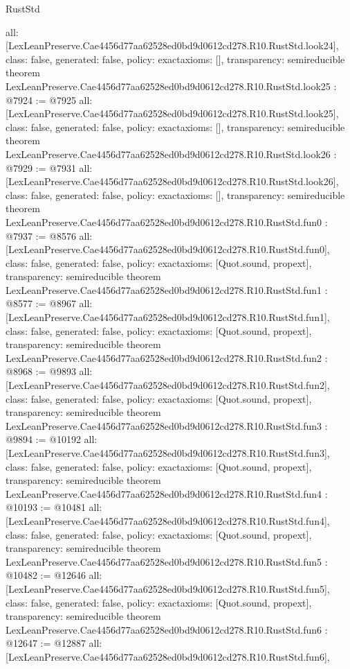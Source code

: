 \begin{lexlean}{RustStd}
\begin{coremodule}
{  all: [LexLeanPreserve.Cae4456d77aa62528ed0bd9d0612cd278.R10.RustStd.look24],
  class: false,
  generated: false,
  policy: exact{axioms: []},
  transparency: semireducible
}
theorem LexLeanPreserve.Cae4456d77aa62528ed0bd9d0612cd278.R10.RustStd.look25 : @7924 := @7925 {
  all: [LexLeanPreserve.Cae4456d77aa62528ed0bd9d0612cd278.R10.RustStd.look25],
  class: false,
  generated: false,
  policy: exact{axioms: []},
  transparency: semireducible
}
theorem LexLeanPreserve.Cae4456d77aa62528ed0bd9d0612cd278.R10.RustStd.look26 : @7929 := @7931 {
  all: [LexLeanPreserve.Cae4456d77aa62528ed0bd9d0612cd278.R10.RustStd.look26],
  class: false,
  generated: false,
  policy: exact{axioms: []},
  transparency: semireducible
}
theorem LexLeanPreserve.Cae4456d77aa62528ed0bd9d0612cd278.R10.RustStd.fun0 : @7937 := @8576 {
  all: [LexLeanPreserve.Cae4456d77aa62528ed0bd9d0612cd278.R10.RustStd.fun0],
  class: false,
  generated: false,
  policy: exact{axioms: [Quot.sound, propext]},
  transparency: semireducible
}
theorem LexLeanPreserve.Cae4456d77aa62528ed0bd9d0612cd278.R10.RustStd.fun1 : @8577 := @8967 {
  all: [LexLeanPreserve.Cae4456d77aa62528ed0bd9d0612cd278.R10.RustStd.fun1],
  class: false,
  generated: false,
  policy: exact{axioms: [Quot.sound, propext]},
  transparency: semireducible
}
theorem LexLeanPreserve.Cae4456d77aa62528ed0bd9d0612cd278.R10.RustStd.fun2 : @8968 := @9893 {
  all: [LexLeanPreserve.Cae4456d77aa62528ed0bd9d0612cd278.R10.RustStd.fun2],
  class: false,
  generated: false,
  policy: exact{axioms: [Quot.sound, propext]},
  transparency: semireducible
}
theorem LexLeanPreserve.Cae4456d77aa62528ed0bd9d0612cd278.R10.RustStd.fun3 : @9894 := @10192 {
  all: [LexLeanPreserve.Cae4456d77aa62528ed0bd9d0612cd278.R10.RustStd.fun3],
  class: false,
  generated: false,
  policy: exact{axioms: [Quot.sound, propext]},
  transparency: semireducible
}
theorem LexLeanPreserve.Cae4456d77aa62528ed0bd9d0612cd278.R10.RustStd.fun4 : @10193 := @10481 {
  all: [LexLeanPreserve.Cae4456d77aa62528ed0bd9d0612cd278.R10.RustStd.fun4],
  class: false,
  generated: false,
  policy: exact{axioms: [Quot.sound, propext]},
  transparency: semireducible
}
theorem LexLeanPreserve.Cae4456d77aa62528ed0bd9d0612cd278.R10.RustStd.fun5 : @10482 := @12646 {
  all: [LexLeanPreserve.Cae4456d77aa62528ed0bd9d0612cd278.R10.RustStd.fun5],
  class: false,
  generated: false,
  policy: exact{axioms: [Quot.sound, propext]},
  transparency: semireducible
}
theorem LexLeanPreserve.Cae4456d77aa62528ed0bd9d0612cd278.R10.RustStd.fun6 : @12647 := @12887 {
  all: [LexLeanPreserve.Cae4456d77aa62528ed0bd9d0612cd278.R10.RustStd.fun6],
}
\end{coremodule}
\end{lexlean}
